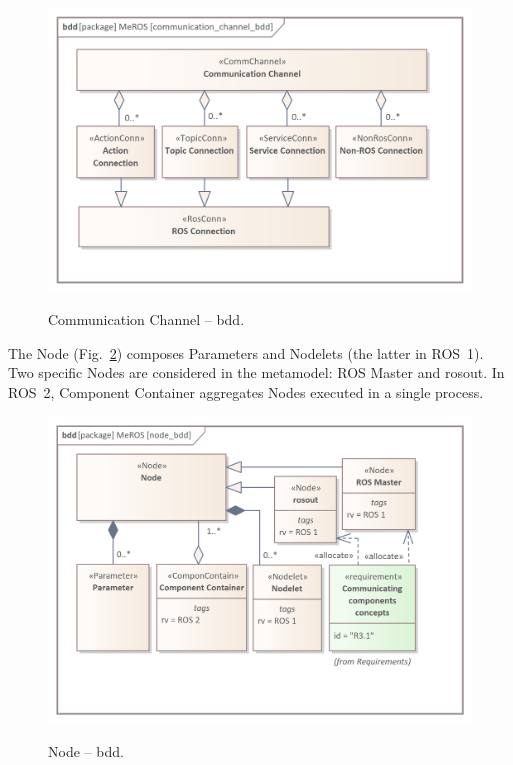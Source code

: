 \documentclass{ieeeaccess}
\begin{document}
 	\begin{figure}[htb]
	 	\centering
	 	\begin{center}
	 		{\includegraphics[scale=0.73]{img/meros_pkg/communication_channel_bdd.png}}
	 	\end{center}
	 	\caption{Communication Channel -- bdd.} 
	 	\label{fig:communication_channel_bdd}
	 \end{figure}
	 
 	The Node (Fig.~\ref{fig:node_bdd}) composes Parameters and Nodelets (the latter in ROS~1). Two specific Nodes are considered in the metamodel: ROS Master and rosout. In ROS~2, Component Container aggregates Nodes executed in a single process.
 	
 	\begin{figure}[htb]
	 	\centering
	 	\begin{center}
	 		{\includegraphics[scale=0.71]{img/meros_pkg/node_bdd.png}}
	 	\end{center}
	 	\caption{Node -- bdd.} 
		 	\label{fig:node_bdd}
	 \end{figure}
	 
\end{document}
